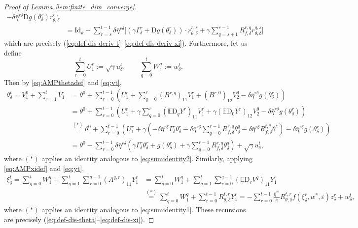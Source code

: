 \documentclass[11pt,letterpaper,reqno]{amsart}
\theoremstyle{definition}
\def\eps{\varepsilon}
\def\D{\mathrm{D}}
\def\E{\mathbb{E}}
\def\Id{\mathrm{Id}}
\begin{document}
\begin{proof}[Proof of Lemma \ref{lem:finite_dim_converge}]
\begin{align*}
-\delta \bar\eta^{r\delta}
\D g(\theta_\delta^r)r_{\theta,\delta}^{r,s}\\
&=\Id_k-\sum_{r=s}^{t-1} \delta\bar\eta^{r\delta}
\bigg[(\gamma \Gamma_\delta^r+\D g(\theta_\delta^r)) \cdot
r_{\theta,\delta}^{r,s}
+\gamma \sum_{q=s+1}^{r-1} R_{f,\delta}^{r,q}r_{\theta,\delta}^{q,s}\bigg]
\end{align*}
which are precisely (\ref{eq:def-dis-deriv-t}--\ref{eq:def-dis-deriv-xi}).
Furthermore, let us define
\begin{equation}\label{eq:AMPuwdef}
\sum_{r=0}^t U_1^r:=\sqrt{\gamma}u_\delta^t,
\qquad \sum_{q=0}^t W_1^q:=w_\delta^t.
\end{equation}
Then by \eqref{eq:AMPthetadef} and \eqref{eq:vt},
\begin{align*}
\theta_\delta^t=V_1^0+\sum_{r=1}^t V_1^r
&=\theta^0+\sum_{r=0}^{t-1}\left(U_1^r+\sum_{q=0}^r (B^{r,q})_{11}V_1^r
+(B^{r,0})_{12}V_2^0-\delta\bar\eta^{r\delta} g(\theta_\delta^r)\right)\\
&=\theta^0+\sum_{r=0}^{t-1} \left(U_1^r+\gamma\sum_{q=0}^r
(\E\D_q Y^r)_{11}V_1^r+\gamma (\E \D_0 Y^r)_{12}V_2^0
-\delta\bar\eta^{r\delta} g(\theta_\delta^r)\right)\\
&\overset{(*)}{=}\theta^0+\sum_{r=0}^{t-1}\left(U_1^r+\gamma
\left({-}\delta\bar\eta^{r\delta}\Gamma_\delta^r \theta_\delta^r-
\delta\bar\eta^{r\delta}
\sum_{q=0}^{r-1} R_{f,\delta}^{r,q}
\theta_\delta^q -\delta\bar\eta^{r\delta} R_{f,\delta}^{t,*}\theta^*\right)
-\delta\bar\eta^{r\delta} g(\theta_\delta^r)\right)\\
&=\theta^0-\sum_{r=0}^{t-1}\delta\bar\eta^{r\delta}
\left(\gamma \Gamma_\delta^r \theta_\delta^r
+g(\theta_\delta^r)+\gamma \sum_{q=0}^{r-1}
R_{f,\delta}^{r,q}\theta_\delta^q\right)+\sqrt{\gamma} u_\delta^t,
\end{align*}
where $(*)$ applies an identity analogous to \eqref{eq:sumidentity2}. Similarly,
applying \eqref{eq:AMPxidef} and \eqref{eq:yt},
\begin{align*}
\xi_\delta^t=\sum_{q=0}^t W_1^q+\sum_{q=1}^t \sum_{r=0}^{q-1}
(A^{q,r})_{11}Y_1^r
&=\sum_{q=0}^t W_1^q+\sum_{q=1}^t \sum_{r=0}^{q-1}
(\E \D_r V^q)_{11}Y_1^r\\
&\overset{(*)}{=}
\sum_{q=0}^t W_1^q+\sum_{r=0}^{t-1} R_{\theta,\delta}^{t,r} Y_1^r
={-}\sum_{r=0}^{t-1} \frac{\bar\eta^{r\delta}}{\bar\kappa}
R_{\theta,\delta}^{t,r}f(\xi_\delta^r,w^*,\eps)z_\delta^r+w_\delta^t,
\end{align*}
where $(*)$ applies an identity analogous to \eqref{eq:sumidentity1}. These
recursions are precisely (\ref{eq:def-dis-theta}--\ref{eq:def-dis-xi}).

\end{proof}
\end{document}
